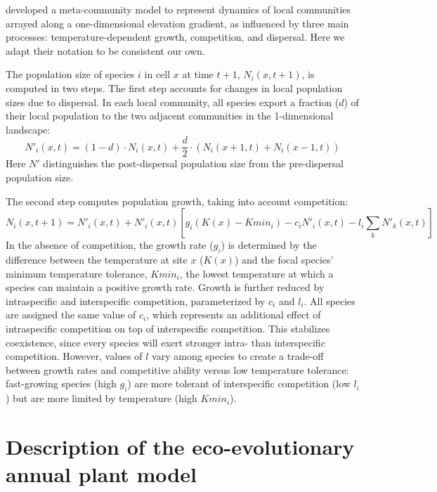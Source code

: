 \documentclass[11pt]{article}
\begin{document}
\cite{alexander_lags_2018} developed a meta-community model to represent dynamics of local communities arrayed along a one-dimensional elevation gradient, as influenced by three main processes: temperature-dependent growth, competition, and dispersal. Here we adapt their notation to be consistent our own.

The population size of species $i$ in cell $x$ at time $t + 1$, $N_{i}(x,t+1)$, is computed in two steps. The first step accounts for changes in local population sizes due to dispersal. In each local community, all species export a fraction ($d$) of their local population to the two adjacent communities in the 1-dimensional landscape:
\begin{equation}
N'_{i}(x,t) = (1-d) \cdot N_{i}(x,t) + \frac{d}{2} \cdot (N_{i}(x+1,t) + N_{i}(x-1,t))
\end{equation}
Here $N'$ distinguishes the post-dispersal population size from the pre-dispersal population size.

The second step computes population growth, taking into account competition:
\begin{equation}
N_{i}(x,t+1) = N'_{i}(x,t) + N'_{i}(x,t)[g_i(K(x) - Kmin_i) - c_i N'_{i}(x,t) - l_i \sum_{k} N'_{k}(x,t)]
\end{equation}
In the absence of competition, the growth rate ($g_i$) is determined by the difference between the temperature at site $x$ ($K(x)$) and the focal species' minimum temperature tolerance, $Kmin_i$, the lowest temperature at which a species can maintain a positive growth rate. Growth is further reduced by intraspecific and interspecific competition, parameterized by $c_i$ and $l_i$.  All species are assigned the same value of $c_i$, which represents an additional effect of intraspecific competition on top of interspecific competition. This stabilizes coexistence, since every species will exert stronger intra- than interspecific competition. However, values of $l$ vary among species to create a trade-off between growth rates and competitive ability versus low temperature tolerance: fast-growing species (high $g_i$) are more tolerant of interspecific competition (low $l_i$) but are more limited by temperature (high $Kmin_i$).

\section{Description of the eco-evolutionary annual plant model}\label{eco-evo}

\end{document}
